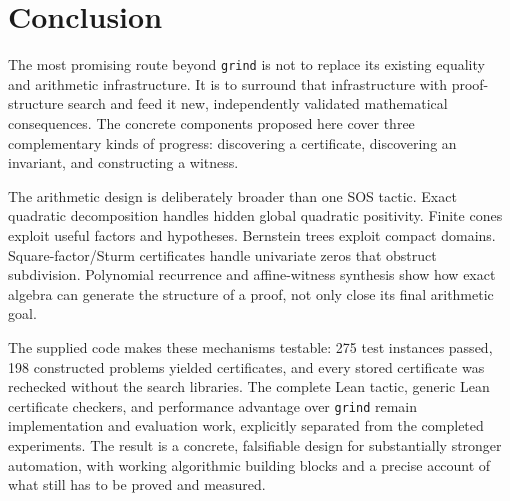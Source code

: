 \documentclass[11pt,a4paper]{article}
\theoremstyle{definition}
\newcommand{\grind}{\texttt{grind}}
\begin{document}
\section{Conclusion}

The most promising route beyond \grind{} is not to replace its existing equality and arithmetic infrastructure. It is to surround that infrastructure with proof-structure search and feed it new, independently validated mathematical consequences. The concrete components proposed here cover three complementary kinds of progress: discovering a certificate, discovering an invariant, and constructing a witness.

The arithmetic design is deliberately broader than one SOS tactic. Exact quadratic decomposition handles hidden global quadratic positivity. Finite cones exploit useful factors and hypotheses. Bernstein trees exploit compact domains. Square-factor/Sturm certificates handle univariate zeros that obstruct subdivision. Polynomial recurrence and affine-witness synthesis show how exact algebra can generate the structure of a proof, not only close its final arithmetic goal.

The supplied code makes these mechanisms testable: 275 test instances passed, 198 constructed problems yielded certificates, and every stored certificate was rechecked without the search libraries. The complete Lean tactic, generic Lean certificate checkers, and performance advantage over \grind{} remain implementation and evaluation work, explicitly separated from the completed experiments. The result is a concrete, falsifiable design for substantially stronger automation, with working algorithmic building blocks and a precise account of what still has to be proved and measured.
\end{document}
